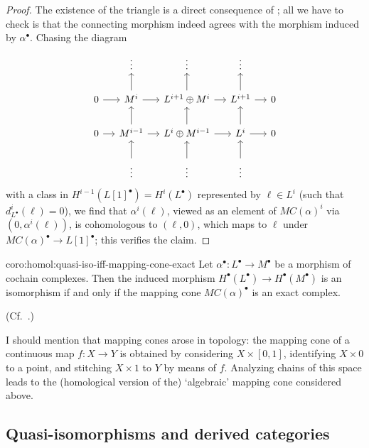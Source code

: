 \begin{proof}
  The existence of the triangle is a direct consequence of
  ; all we have to check is that the connecting
  morphism indeed agrees with the morphism induced by
  $\alpha^\bullet$.  Chasing the diagram
  \[\begin{tikzcd}[column sep=small]
      & \vdots & \vdots & \vdots & \\
      0 \arrow[r] & M^i \arrow[r] \arrow[u] &
      L^{i+1} \oplus M^i \arrow[r] \arrow[u] & L^{i+1} \arrow[r] \arrow[u] & 0 \\
      0 \arrow[r] & M^{i-1} \arrow[r] \arrow[u] &
      L^i \oplus M^{i-1} \arrow[r] \arrow[u] & L^i \arrow[r] \arrow[u] & 0 \\
      & \vdots \arrow[u] & \vdots \arrow[u] & \vdots \arrow[u] &
    \end{tikzcd}\] with a class in
  $H^{i-1}(L[1]^\bullet) = H^i(L^\bullet)$ represented by
  $\ell \in L^i$ (such that $d^i_{L^\bullet}(\ell) = 0$), we find that
  $\alpha^i(\ell)$, viewed as an element of $MC(\alpha)^i$ via
  $(0, \alpha^i(\ell))$, is cohomologous to $(\ell, 0)$,
  which maps to $\ell$ under $MC(\alpha)^\bullet \to L[1]^\bullet$;
  this verifies the claim.
\end{proof}

\begin{coro}{}{coro:homol:quasi-iso-iff-mapping-cone-exact}
  Let $\alpha^\bullet : L^\bullet \to M^\bullet$ be a morphism of
  cochain complexes. Then the induced morphism
  $H^\bullet(L^\bullet) \to H^\bullet(M^\bullet)$ is an isomorphism if
  and only if the mapping cone $MC(\alpha)^\bullet$ is an exact
  complex.

  (Cf.\
  .)
\end{coro}

I should mention that mapping cones arose in topology: the mapping
cone of a continuous map $f : X \to Y$ is obtained by considering
$X \times [0,1]$, identifying $X \times 0$ to a point, and stitching
$X \times 1$ to $Y$ by means of $f$. Analyzing chains of this space
leads to the (homological version of the) `algebraic' mapping cone
considered above.

\subsection{Quasi-isomorphisms and derived categories}
\label{subsec:homol:quasi-isomorphisms-and-derived-categories}

